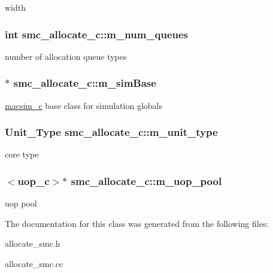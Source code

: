\label{classsmc__allocate__c_a5cdf0163de169d08e9b51a760381c66d}
width \hypertarget{classsmc__allocate__c_afea356100a59d2bf67ee102c1e41e4f2}{
\subsubsection[{m\_\-num\_\-queues}]{\setlength{\rightskip}{0pt plus 5cm}int {\bf smc\_\-allocate\_\-c::m\_\-num\_\-queues}}}
\label{classsmc__allocate__c_afea356100a59d2bf67ee102c1e41e4f2}
number of allocation queue types \hypertarget{classsmc__allocate__c_abd96160a09d01811d1920c3330731107}{
\subsubsection[{m\_\-simBase}]{$\ast$ {\bf smc\_\-allocate\_\-c::m\_\-simBase}}}
\label{classsmc__allocate__c_abd96160a09d01811d1920c3330731107}
\hyperlink{classmacsim__c}{macsim\_\-c} base class for simulation globals \hypertarget{classsmc__allocate__c_aeb14fe67ed777300d891a22ed3db120d}{
\subsubsection[{m\_\-unit\_\-type}]{\setlength{\rightskip}{0pt plus 5cm}Unit\_\-Type {\bf smc\_\-allocate\_\-c::m\_\-unit\_\-type}}}
\label{classsmc__allocate__c_aeb14fe67ed777300d891a22ed3db120d}
core type \hypertarget{classsmc__allocate__c_a1fce12aa293716b7c3ea687c0400dcf3}{
\subsubsection[{m\_\-uop\_\-pool}]{$<${\bf uop\_\-c}$>$$\ast$ {\bf smc\_\-allocate\_\-c::m\_\-uop\_\-pool}}}
\label{classsmc__allocate__c_a1fce12aa293716b7c3ea687c0400dcf3}
uop pool 

The documentation for this class was generated from the following files:\begin{DoxyCompactItemize}
\item 
allocate\_\-smc.h\item 
allocate\_\-smc.cc\end{DoxyCompactItemize}
